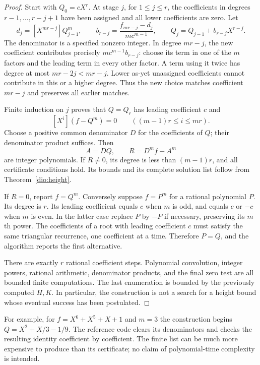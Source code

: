 \begin{proof}
Start with $Q_0=cX^r$.  At stage $j$, for $1\leq j\leq r$, the
coefficients in degrees $r-1,\ldots,r-j+1$ have been assigned and all
lower coefficients are zero.  Let
\[
 d_j=[X^{mr-j}]Q_{j-1}^{m},\qquad
 b_{r-j}=\frac{f_{mr-j}-d_j}{m c^{m-1}},\qquad
 Q_j=Q_{j-1}+b_{r-j}X^{r-j}.
\]
The denominator is a specified nonzero integer.  In degree $mr-j$, the
new coefficient contributes precisely $m c^{m-1}b_{r-j}$: choose its
term in one of the $m$ factors and the leading term in every other
factor.  A term using it twice has degree at most $mr-2j<mr-j$.
Lower as-yet unassigned coefficients cannot contribute in this or a
higher degree.  Thus the new choice matches coefficient $mr-j$ and
preserves all earlier matches.

Finite induction on $j$ proves that $Q=Q_r$ has leading coefficient
$c$ and
\[
             [X^i](f-Q^m)=0\qquad((m-1)r\leq i\leq mr).
\]
Choose a positive common denominator $D$ for the coefficients of $Q$;
their denominator product suffices.  Then
\[
                    A=DQ,\qquad R=D^m f-A^m
\]
are integer polynomials.  If $R\ne0$, its degree is less than
$(m-1)r$, and all certificate conditions hold.  Its bounds and its
complete solution list follow from Theorem~\ref{dio:height}.

If $R=0$, report $f=Q^m$.  Conversely suppose $f=P^m$ for a rational
polynomial $P$.  Its degree is $r$.  Its leading coefficient equals $c$
when $m$ is odd, and equals $c$ or $-c$ when $m$ is even.  In the latter
case replace $P$ by $-P$ if necessary, preserving its $m$th power.
The coefficients of a root with leading coefficient $c$ must satisfy
the same triangular recurrence, one coefficient at a time.  Therefore
$P=Q$, and the algorithm reports the first alternative.

There are exactly $r$ rational coefficient steps.  Polynomial
convolution, integer powers, rational arithmetic, denominator products,
and the final zero test are all bounded finite computations.  The last
enumeration is bounded by the previously computed $H,K$.  In particular,
the construction is not a search for a height bound whose eventual
success has been postulated.
\end{proof}

For example, for $f=X^6+X^5+X+1$ and $m=3$ the construction begins
$Q=X^2+X/3-1/9$.  The reference code clears its denominators and checks
the resulting identity coefficient by coefficient.  The finite list
can be much more expensive to produce than its certificate; no claim
of polynomial-time complexity is intended.

